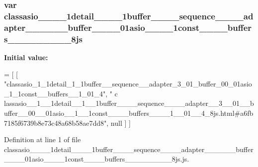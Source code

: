 \subsubsection[{classasio\+\_\+\+\_\+1\+\_\+\+\_\+1detail\+\_\+\+\_\+1\+\_\+\+\_\+1buffer\+\_\+\+\_\+\+\_\+\+\_\+sequence\+\_\+\+\_\+\+\_\+\+\_\+adapter\+\_\+\+\_\+3\+\_\+\+\_\+01\+\_\+\+\_\+buffer\+\_\+\+\_\+00\+\_\+\+\_\+01asio\+\_\+\+\_\+1\+\_\+\+\_\+1const\+\_\+\+\_\+\+\_\+\+\_\+buffers\+\_\+\+\_\+\+\_\+\+\_\+1\+\_\+\+\_\+01\+\_\+\+\_\+4\+\_\+8js}]{\setlength{\rightskip}{0pt plus 5cm}var classasio\+\_\+\+\_\+\_\+\+\_\+1detail\+\_\+\+\_\+\_\+\+\_\+1buffer\+\_\+\+\_\+\+\_\+\+\_\+sequence\+\_\+\+\_\+\+\_\+\+\_\+adapter\+\_\+\+\_\+\_\+\+\_\+\_\+\+\_\+buffer\+\_\+\+\_\+\_\+\+\_\+01asio\+\_\+\+\_\+\_\+\+\_\+1const\+\_\+\+\_\+\+\_\+\+\_\+buffers\+\_\+\+\_\+\+\_\+\+\_\+\_\+\+\_\+\_\+\+\_\+\_\+8js}\label{classasio____1____1detail____1____1buffer________sequence________adapter____3____01____buffer___efc5a3f5a7b1e76a1a2570f80ad903f2_a8c626323c65512f728a857043537ffa5}
{\bfseries Initial value\+:}
\begin{DoxyCode}
=
[
    [ \textcolor{stringliteral}{"classasio\_1\_1detail\_1\_1buffer\_\_sequence\_\_adapter\_3\_01\_buffer\_00\_01asio\_1\_1const\_\_buffers\_\_1\_01\_4"}, \textcolor{stringliteral}{"
      c
      lassasio\_\_1\_\_1detail\_\_1\_\_1buffer\_\_\_\_sequence\_\_\_\_adapter\_\_3\_\_01\_\_buffer\_\_00\_\_01asio\_\_1\_\_1const\_\_\_\_buffers\_\_\_\_1\_\_01\_\_4\_8js.html#a6fb7185f6739b8e73c48a68b58ae7dd8"}, null ]
]
\end{DoxyCode}


Definition at line 1 of file classasio\+\_\+\+\_\+\_\+\+\_\+1detail\+\_\+\+\_\+\_\+\+\_\+1buffer\+\_\+\+\_\+\+\_\+\+\_\+sequence\+\_\+\+\_\+\+\_\+\+\_\+adapter\+\_\+\+\_\+\_\+\+\_\+\_\+\+\_\+buffer\+\_\+\+\_\+\_\+\+\_\+01asio\+\_\+\+\_\+\_\+\+\_\+1const\+\_\+\+\_\+\+\_\+\+\_\+buffers\+\_\+\+\_\+\+\_\+\+\_\+\_\+\+\_\+\_\+\+\_\+\_\+8js.\+js.

